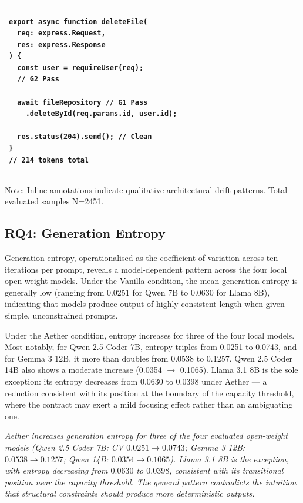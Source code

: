 \documentclass[review,12pt,3p]{elsarticle}
\begin{document}
\begin{table}[htbp]
\begin{tabular}{p{} | p{}}
\begin{minipage}[t]{0.48\textwidth}
\begin{verbatim}
export async function deleteFile(
  req: express.Request,
  res: express.Response
) {
  const user = requireUser(req);
  // G2 Pass

  await fileRepository // G1 Pass
    .deleteById(req.params.id, user.id);

  res.status(204).send(); // Clean
}
// 214 tokens total
\end{verbatim}
\end{minipage} \\
\bottomrule
\end{tabular}
\begin{flushleft}
\footnotesize{Note: Inline annotations indicate qualitative architectural drift patterns. Total evaluated samples N=2451.}
\end{flushleft}
\end{table}
\clearpage

\subsection{RQ4: Generation Entropy}

Generation entropy, operationalised as the coefficient of variation across ten iterations
per prompt, reveals a model-dependent pattern across the four local open-weight models.
Under the Vanilla condition, the mean generation entropy is generally low (ranging from 0.0251
for Qwen 7B to 0.0630 for Llama 8B), indicating that models produce output of highly consistent
length when given simple, unconstrained prompts.

Under the Aether condition, entropy increases for three of the four local models. Most notably,
for Qwen 2.5 Coder 7B, entropy triples from 0.0251 to 0.0743, and for Gemma 3 12B, it more
than doubles from 0.0538 to 0.1257. Qwen 2.5 Coder 14B also shows a moderate increase
(0.0354 $\to$ 0.1065). Llama 3.1 8B is the sole exception: its entropy decreases from 0.0630
to 0.0398 under Aether --- a reduction consistent with its position at the boundary of the
capacity threshold, where the contract may exert a mild focusing effect rather than an
ambiguating one.

\begin{tcolorbox}[
  colback=gray!10,
  colframe=black!60,
  title=\textbf{RQ4 Summary},
  fonttitle=\bfseries,
  breakable
]
\textit{Aether increases generation entropy for three of the four evaluated open-weight models
(Qwen 2.5 Coder 7B: CV $0.0251 \to 0.0743$; Gemma 3 12B: $0.0538 \to 0.1257$; Qwen 14B:
$0.0354 \to 0.1065$). Llama 3.1 8B is the exception, with entropy decreasing from $0.0630$
to $0.0398$, consistent with its transitional position near the capacity threshold. The
general pattern contradicts the intuition that structural constraints should produce more
deterministic outputs.}
\end{tcolorbox}
\end{document}
